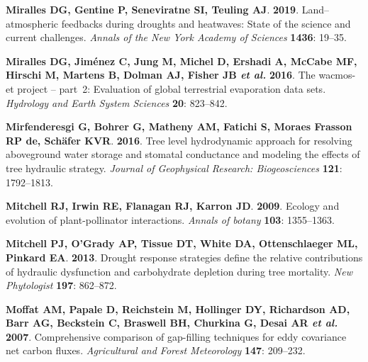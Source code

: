 \documentclass[11pt,twoside]{reedthesis}
\begin{document}
\hypertarget{ref-Miralles2019}{}
\textbf{\textnormal{Miralles DG}, \textnormal{Gentine P},
\textnormal{Seneviratne SI}, \textnormal{Teuling AJ}}. \textbf{2019}.
Land--atmospheric feedbacks during droughts and heatwaves: State of the
science and current challenges. \emph{Annals of the New York Academy of
Sciences} \textbf{1436}: 19--35.

\hypertarget{ref-Miralles2016}{}
\textbf{\textnormal{Miralles DG}, \textnormal{Jiménez C},
\textnormal{Jung M}, \textnormal{Michel D}, \textnormal{Ershadi A},
\textnormal{McCabe MF}, \textnormal{Hirschi M}, \textnormal{Martens B},
\textnormal{Dolman AJ}, \textnormal{Fisher JB} \emph{et al.}}
\textbf{2016}. The wacmos-et project -- part~2: Evaluation of global
terrestrial evaporation data sets. \emph{Hydrology and Earth System
Sciences} \textbf{20}: 823--842.

\hypertarget{ref-Mirfenderesgi2016}{}
\textbf{\textnormal{Mirfenderesgi G}, \textnormal{Bohrer G},
\textnormal{Matheny AM}, \textnormal{Fatichi S}, \textnormal{Moraes
Frasson RP de}, \textnormal{Schäfer KVR}}. \textbf{2016}. Tree level
hydrodynamic approach for resolving aboveground water storage and
stomatal conductance and modeling the effects of tree hydraulic
strategy. \emph{Journal of Geophysical Research: Biogeosciences}
\textbf{121}: 1792--1813.

\hypertarget{ref-Mitchell2009}{}
\textbf{\textnormal{Mitchell RJ}, \textnormal{Irwin RE},
\textnormal{Flanagan RJ}, \textnormal{Karron JD}}. \textbf{2009}.
Ecology and evolution of plant-pollinator interactions. \emph{Annals of
botany} \textbf{103}: 1355--1363.

\hypertarget{ref-mitchell_drought_2013}{}
\textbf{\textnormal{Mitchell PJ}, \textnormal{O'Grady AP},
\textnormal{Tissue DT}, \textnormal{White DA},
\textnormal{Ottenschlaeger ML}, \textnormal{Pinkard EA}}. \textbf{2013}.
Drought response strategies define the relative contributions of
hydraulic dysfunction and carbohydrate depletion during tree mortality.
\emph{New Phytologist} \textbf{197}: 862--872.

\hypertarget{ref-Moffat2007}{}
\textbf{\textnormal{Moffat AM}, \textnormal{Papale D},
\textnormal{Reichstein M}, \textnormal{Hollinger DY},
\textnormal{Richardson AD}, \textnormal{Barr AG}, \textnormal{Beckstein
C}, \textnormal{Braswell BH}, \textnormal{Churkina G}, \textnormal{Desai
AR} \emph{et al.}} \textbf{2007}. Comprehensive comparison of
gap-filling techniques for eddy covariance net carbon fluxes.
\emph{Agricultural and Forest Meteorology} \textbf{147}: 209--232.
\end{document}
